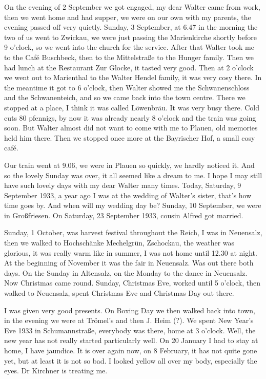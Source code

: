 \documentclass[a5paper,11pt,openany]{book}
\newcommand{\seite}[1]{\leavevmode\marginpar{\footnotesize\itshape\raggedright #1}\ignorespaces}
\newcommand{\jahr}[1]{\par\medskip\noindent{\scshape #1}\par\nopagebreak}
\begin{document}
\jahr{1933.}
\seite{23}
On the evening of 2 September we got engaged,
  my dear Walter came from work, then we went home and had supper,
  we were on our own with my parents, the evening passed off very quietly.
Sunday, 3 September, at 6.47 in the morning the two of us went to Zwickau, we were just passing the Marienkirche shortly before 9 o'clock,
  so we went into the church for the service.
After that Walter took me to the Café Buschbeck, then to the Mittelstraße to the Hunger family.
Then we had lunch at the Restaurant Zur Glocke, it tasted very good.
Then at 2 o'clock
\seite{24}
we went out to Marienthal to the Walter Hendel family, it was very cosy there.
In the meantime it got to 6 o'clock, then Walter showed me the Schwanenschloss and the Schwanenteich, and so we came back into the town centre.
There we stopped at a place, I think it was called Löwenbräu.
It was very busy there.
Cold cuts 80 pfennigs, by now it was already nearly 8 o'clock and the train was going soon.
But Walter almost did not want to come with me to Plauen, old memories held him there.
Then we stopped once more at the Bayrischer Hof, a small cosy café.

\seite{25}
Our train went at 9.06, we were in Plauen so quickly, we hardly noticed it.
And so the lovely Sunday was over,
  it all seemed like a dream to me.
I hope I may still have such lovely days with my dear Walter many times.
Today, Saturday, 9 September 1933, a year ago I was at the wedding of Walter's sister, that's how time goes by.
And when will my wedding day be?
Sunday, 10 September, we were in Großfriesen.
On Saturday, 23 September 1933, cousin Alfred got married.

\seite{26}
Sunday, 1 October, was harvest festival throughout the Reich, I was in Neuensalz,
  then we walked to Hochschänke Mechelgrün, Zschockau, the weather was glorious,
  it was really warm like in summer, I was not home until 12.30 at night.
At the beginning of November it was the fair in Neuensalz.
Was out there both days.
On the Sunday in Altensalz, on the Monday to the dance in Neuensalz.
Now Christmas came round.
Sunday, Christmas Eve, worked until 5 o'clock, then walked to Neuensalz, spent Christmas Eve and Christmas Day out there.

\jahr{1934.}
\seite{27}
I was given very good presents.
On Boxing Day we then walked back into town, in the evening we were at Trömel's and then J. Heim (?).
We spent New Year's Eve 1933 in Schumannstraße,
  everybody was there, home at 3 o'clock.
Well, the new year has not really started particularly well.
On 20 January I had to stay at home,
  I have jaundice.
It is over again now, on 8 February,
  it has not quite gone yet, but at least it is not so bad.
I looked yellow all over my body, especially the eyes.
Dr Kirchner is treating me.
\end{document}
